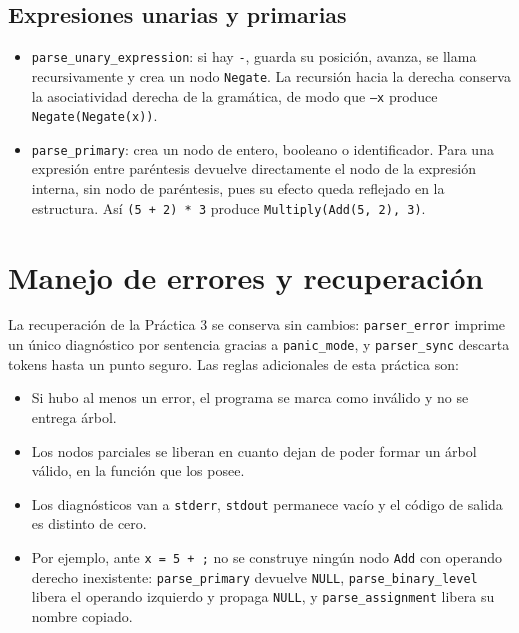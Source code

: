 \documentclass[12pt,letterpaper]{article}
\begin{document}
\subsection*{Expresiones unarias y primarias}

\begin{itemize}
\item \texttt{parse\_unary\_expression}: si hay \texttt{-}, guarda su posición, avanza, se llama
  recursivamente y crea un nodo \texttt{Negate}. La recursión hacia la derecha conserva la asociatividad
  derecha de la gramática, de modo que \texttt{--x} produce \texttt{Negate(Negate(x))}.
\item \texttt{parse\_primary}: crea un nodo de entero, booleano o identificador. Para una expresión entre
  paréntesis devuelve directamente el nodo de la expresión interna, sin nodo de paréntesis, pues su efecto
  queda reflejado en la estructura. Así \texttt{(5 + 2) * 3} produce \texttt{Multiply(Add(5, 2), 3)}.
\end{itemize}


\section*{Manejo de errores y recuperación}

La recuperación de la Práctica 3 se conserva sin cambios: \texttt{parser\_error} imprime un único diagnóstico
por sentencia gracias a \texttt{panic\_mode}, y \texttt{parser\_sync} descarta tokens hasta un punto seguro.
Las reglas adicionales de esta práctica son:

\begin{itemize}
\item Si hubo al menos un error, el programa se marca como inválido y no se entrega árbol.
\item Los nodos parciales se liberan en cuanto dejan de poder formar un árbol válido, en la función que los
  posee.
\item Los diagnósticos van a \texttt{stderr}, \texttt{stdout} permanece vacío y el código de salida es
  distinto de cero.
\item Por ejemplo, ante \texttt{x = 5 + ;} no se construye ningún nodo \texttt{Add} con operando derecho
  inexistente: \texttt{parse\_primary} devuelve \texttt{NULL}, \texttt{parse\_binary\_level} libera el
  operando izquierdo y propaga \texttt{NULL}, y \texttt{parse\_assignment} libera su nombre copiado.
\end{itemize}
\end{document}
